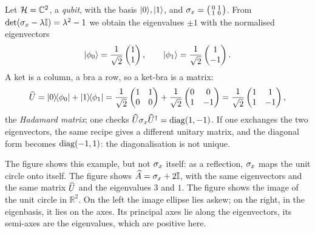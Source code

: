 \begin{example}
	Let $\mathcal{H} = \mathbb{C}^2$, a \emph{qubit}, with the basis $\lvert 0 \rangle,\lvert 1 \rangle$, and $\sigma_{x} = \bigl(\begin{smallmatrix} 0 & 1 \\ 1 & 0\end{smallmatrix}\bigr)$. From $\det(\sigma_{x} - \lambda\mathbb{I}) = \lambda^2 - 1$ we obtain the eigenvalues $\pm 1$ with the normalised eigenvectors
	\begin{equation}
		\lvert \phi_0 \rangle = \frac{1}{\sqrt{2}}\begin{pmatrix} 1 \\ 1 \end{pmatrix}, \qquad \lvert \phi_1 \rangle = \frac{1}{\sqrt{2}}\begin{pmatrix} 1 \\ -1 \end{pmatrix}.
	\end{equation}
	A ket is a column, a bra a row, so a ket-bra is a matrix:
	\begin{equation}
		\widehat{U} = \lvert 0 \rangle\!\langle \phi_0 \rvert + \lvert 1 \rangle\!\langle \phi_1 \rvert = \frac{1}{\sqrt{2}}\begin{pmatrix} 1 & 1 \\ 0 & 0 \end{pmatrix} + \frac{1}{\sqrt{2}}\begin{pmatrix} 0 & 0 \\ 1 & -1 \end{pmatrix} = \frac{1}{\sqrt{2}}\begin{pmatrix} 1 & 1 \\ 1 & -1 \end{pmatrix},
	\end{equation}
	the \emph{Hadamard matrix}; one checks $\widehat{U}\sigma_{x}\widehat{U}^{\dagger} = \operatorname{diag}(1,-1)$. If one exchanges the two eigenvectors, the same recipe gives a different unitary matrix, and the diagonal form becomes $\operatorname{diag}(-1,1)$: the diagonalisation is not unique.
\end{example}



The figure shows this example, but not $\sigma_{x}$ itself: as a reflection, $\sigma_{x}$ maps the unit circle onto itself. The figure shows $\widehat{A} = \sigma_{x} + 2\mathbb{I}$, with the same eigenvectors and the same matrix $\widehat{U}$ and the eigenvalues $3$ and $1$. The figure shows the image of the unit circle in $\mathbb{R}^2$. On the left the image ellipse lies askew; on the right, in the eigenbasis, it lies on the axes. Its principal axes lie along the eigenvectors, its semi-axes are the eigenvalues, which are positive here.

